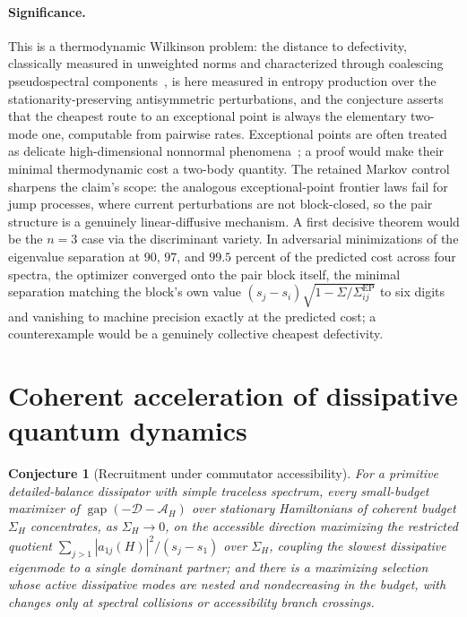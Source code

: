 \documentclass[11pt]{article}
\newtheorem{conjecture}{Conjecture}
\theoremstyle{definition}
\begin{document}
\paragraph{Significance.}
This is a thermodynamic Wilkinson problem: the distance to defectivity, classically measured in unweighted norms and characterized through coalescing pseudospectral components~\cite{ABBO11}, is here measured in entropy production over the stationarity-preserving antisymmetric perturbations, and the conjecture asserts that the cheapest route to an exceptional point is always the elementary two-mode one, computable from pairwise rates.  Exceptional points are often treated as delicate high-dimensional nonnormal phenomena~\cite{Heiss12}; a proof would make their minimal thermodynamic cost a two-body quantity.  The retained Markov control sharpens the claim's scope: the analogous exceptional-point frontier laws fail for jump processes, where current perturbations are not block-closed, so the pair structure is a genuinely linear-diffusive mechanism.  A first decisive theorem would be the $n=3$ case via the discriminant variety.  In adversarial minimizations of the eigenvalue separation at $90$, $97$, and $99.5$ percent of the predicted cost across four spectra, the optimizer converged onto the pair block itself, the minimal separation matching the block's own value $(s_j-s_i)\sqrt{1-\Sigma/\Sigma^{\mathrm{EP}}_{ij}}$ to six digits and vanishing to machine precision exactly at the predicted cost; a counterexample would be a genuinely collective cheapest defectivity.

\section{Coherent acceleration of dissipative quantum dynamics}

\begin{conjecture}[Recruitment under commutator accessibility]\label{ag7}
For a primitive detailed-balance dissipator with simple traceless spectrum, every small-budget maximizer of $\operatorname{gap}(-\mathcal D-\mathcal A_H)$ over stationary Hamiltonians of coherent budget $\Sigma_H$ concentrates, as $\Sigma_H\to0$, on the accessible direction maximizing the restricted quotient $\sum_{j>1}|a_{1j}(H)|^2/(s_j-s_1)$ over $\Sigma_H$, coupling the slowest dissipative eigenmode to a single dominant partner; and there is a maximizing selection whose active dissipative modes are nested and nondecreasing in the budget, with changes only at spectral collisions or accessibility branch crossings.
\end{conjecture}
\end{document}
